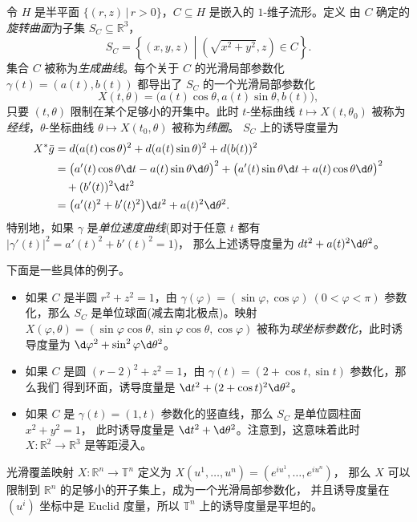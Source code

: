 \begin{example}[旋转曲面]\label{exa:surface of revolution}
  令 $H$ 是半平面 $\{(r,z)\,|\, r>0\}$，$C\subseteq H$ 是嵌入的 $1$-维子流形。定义
  由 $C$ 确定的\emph{旋转曲面}为子集 $S_C\subseteq \mathbb{R}^3$，
  \[
    S_C=\left\{
      (x,y,z)\middle| \left(
        \sqrt{x^2+y^2},z
      \right)\in C
    \right\}.
  \]
  集合 $C$ 被称为\emph{生成曲线}。每个关于 $C$ 的光滑局部参数化 $\gamma(t)=(a(t),b(t))$
  都导出了 $S_C$ 的一个光滑局部参数化
  \[
    X(t,\theta)=\bigl(a(t)\cos\theta,a(t)\sin\theta,b(t)\bigr),
  \]
  只要 $(t,\theta)$ 限制在某个足够小的开集中。此时 $t$-坐标曲线 $t\mapsto X(t,\theta_0)$
  被称为\emph{经线}，$\theta$-坐标曲线 $\theta\mapsto X(t_0,\theta)$ 被称为\emph{纬圈}。
  $S_C$ 上的诱导度量为
  \begin{align*}
    X^*\bar g&=d(a(t)\cos\theta)^2+d(a(t)\sin\theta)^2+d(b(t))^2\\
    &=\bigl(a'(t)\cos\theta\d t-a(t)\sin\theta\d\theta\bigr)^2+\bigl(a'(t)\sin\theta\d t+a(t)\cos\theta\d\theta\bigr)^2\\
    &\quad+(b'(t))^2\d t^2\\
    &=\bigl(a'(t)^2+b'(t)^2\bigr)\d t^2+a(t)^2\d\theta^2.
  \end{align*}
  特别地，如果 $\gamma$ 是\emph{单位速度曲线}(即对于任意 $t$ 都有 $|\gamma'(t)|^2=a'(t)^2+b'(t)^2=1$)，
  那么上述诱导度量为 $dt^2+a(t)^2\d\theta^2$。

  下面是一些具体的例子。
  \begin{itemize}[nosep]
    \item 如果 $C$ 是半圆 $r^2+z^2=1$，由 $\gamma(\varphi)=(\sin\varphi,\cos\varphi)\ (0<\varphi<\pi)$
    参数化，那么 $S_C$ 是单位球面(减去南北极点)。映射 $X(\varphi,\theta)=(\sin\varphi\cos\theta,\sin\varphi\cos\theta,\cos\varphi)$
    被称为\emph{球坐标参数化}，此时诱导度量为 $\d\varphi^2+\sin^2\varphi\d\theta^2$。
    \item 如果 $C$ 是圆 $(r-2)^2+z^2=1$，由 $\gamma(t)=(2+\cos t,\sin t)$ 参数化，那么我们
    得到环面，诱导度量是 $\d t^2+(2+\cos t)^2\d\theta^2$。
    \item 如果 $C$ 是 $\gamma(t)=(1,t)$ 参数化的竖直线，那么 $S_C$ 是单位圆柱面 $x^2+y^2=1$，
    此时诱导度量是 $\d t^2+\d\theta^2$。注意到，这意味着此时 $X: \mathbb{R}^2\to \mathbb{R}^3$
    是等距浸入。
  \end{itemize}
\end{example}

\begin{example}[$n$-环面]
  光滑覆盖映射 $X:\mathbb{R}^n\to \mathbb{T}^n$ 定义为 $X(u^1,\dots,u^n)=(e^{iu^1},\dots,e^{iu^n})$，
  那么 $X$ 可以限制到 $\mathbb{R}^n$ 的足够小的开子集上，成为一个光滑局部参数化，
  并且诱导度量在 $(u^i)$ 坐标中是 Euclid 度量，所以 $\mathbb{T}^n$ 上的诱导度量是平坦的。
\end{example}

